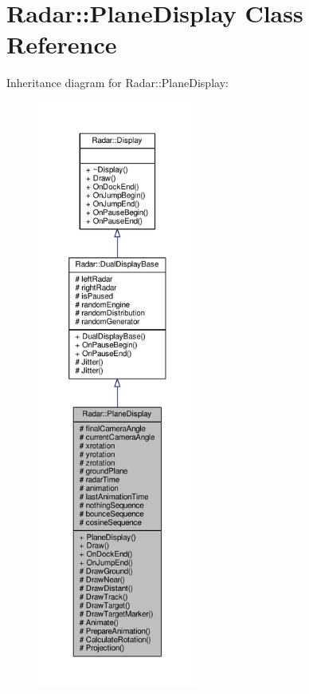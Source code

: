 \hypertarget{classRadar_1_1PlaneDisplay}{}\section{Radar\+:\+:Plane\+Display Class Reference}
\label{classRadar_1_1PlaneDisplay}


Inheritance diagram for Radar\+:\+:Plane\+Display\+:
\nopagebreak
\begin{figure}[H]
\begin{center}
\leavevmode
\includegraphics[height=550pt]{dd/d43/classRadar_1_1PlaneDisplay__inherit__graph}
\end{center}
\end{figure}


